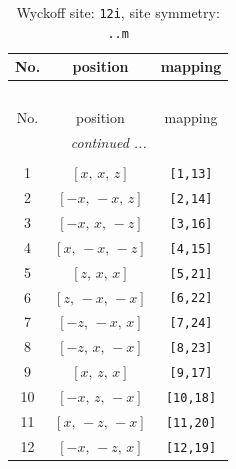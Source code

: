 \documentclass[fleqn,8pt]{jsarticle}
\begin{document}
\begin{longtable}{ccc}
\caption{Wyckoff site: {\tt 12i}, site symmetry: {\tt ..m}}
 \\
 \hline \hline
No. & position & mapping \\ \hline \endfirsthead

\multicolumn{2}{l}{\tablename\ \thetable{}} \\
 \hline \hline
No. & position & mapping \\ \hline \endhead

 \hline \hline
\multicolumn{2}{r}{\footnotesize\it continued ...} \\ \endfoot

 \hline \hline
\multicolumn{2}{r}{} \\ \endlastfoot

1 & $\left[ x,\, x,\, z \right]$ & {\tt [1,13]} \\ \hline
2 & $\left[ - x,\, - x,\, z \right]$ & {\tt [2,14]} \\ \hline
3 & $\left[ - x,\, x,\, - z \right]$ & {\tt [3,16]} \\ \hline
4 & $\left[ x,\, - x,\, - z \right]$ & {\tt [4,15]} \\ \hline
5 & $\left[ z,\, x,\, x \right]$ & {\tt [5,21]} \\ \hline
6 & $\left[ z,\, - x,\, - x \right]$ & {\tt [6,22]} \\ \hline
7 & $\left[ - z,\, - x,\, x \right]$ & {\tt [7,24]} \\ \hline
8 & $\left[ - z,\, x,\, - x \right]$ & {\tt [8,23]} \\ \hline
9 & $\left[ x,\, z,\, x \right]$ & {\tt [9,17]} \\ \hline
10 & $\left[ - x,\, z,\, - x \right]$ & {\tt [10,18]} \\ \hline
11 & $\left[ x,\, - z,\, - x \right]$ & {\tt [11,20]} \\ \hline
12 & $\left[ - x,\, - z,\, x \right]$ & {\tt [12,19]} \\
\end{longtable}
\renewcommand{\arraystretch}{1.2}
\end{document}
